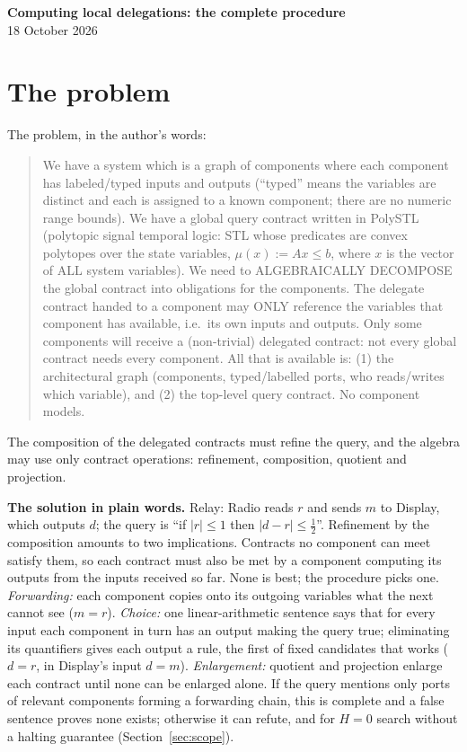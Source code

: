 \documentclass[10pt]{article}
\theoremstyle{tplain}\newtheorem{theorem}{Theorem}\newtheorem{lemma}[theorem]{Lemma}\newtheorem{proposition}[theorem]{Proposition}\newtheorem{corollary}[theorem]{Corollary}
\theoremstyle{tdef}\newtheorem{definition}[theorem]{Definition}
\begin{document}
\begin{center}{\large\bfseries Computing local delegations: the complete procedure}\\[1pt] 18 October 2026\end{center}

\section{The problem}
The problem, in the author's words:\vspace{-2pt}
\begin{quote}\fontsize{8}{9.5}\selectfont
We have a system which is a graph of components where each component has labeled/typed inputs and outputs (``typed'' means the variables are distinct and each is assigned to a known component; there are no numeric range bounds). We have a global query contract written in PolySTL (polytopic signal temporal logic: STL whose predicates are convex polytopes over the state variables, $\mu(x):=Ax\le b$, where $x$ is the vector of ALL system variables). We need to ALGEBRAICALLY DECOMPOSE the global contract into obligations for the components. The delegate contract handed to a component may ONLY reference the variables that component has available, i.e.\ its own inputs and outputs. Only some components will receive a (non-trivial) delegated contract: not every global contract needs every component. All that is available is: (1) the architectural graph (components, typed/labelled ports, who reads/writes which variable), and (2) the top-level query contract. No component models.
\end{quote}\vspace{-3pt}
The composition of the delegated contracts must refine the query, and the algebra may use only contract operations: refinement, composition, quotient and projection.

\textbf{The solution in plain words.} Relay: Radio reads $r$ and sends $m$ to Display, which outputs $d$; the query is ``if $|r|\le1$ then $|d-r|\le\frac12$''. Refinement by the composition amounts to two implications. Contracts no component can meet satisfy them, so each contract must also be met by a component computing its outputs from the inputs received so far. None is best; the procedure picks one. \emph{Forwarding:} each component copies onto its outgoing variables what the next cannot see ($m=r$). \emph{Choice:} one linear-arithmetic sentence says that for every input each component in turn has an output making the query true; eliminating its quantifiers gives each output a rule, the first of fixed candidates that works ($d=r$, in Display's input $d=m$). \emph{Enlargement:} quotient and projection enlarge each contract until none can be enlarged alone. If the query mentions only ports of relevant components forming a forwarding chain, this is complete and a false sentence proves none exists; otherwise it can refute, and for $H=0$ search without a halting guarantee (Section~\ref{sec:scope}).
\end{document}
